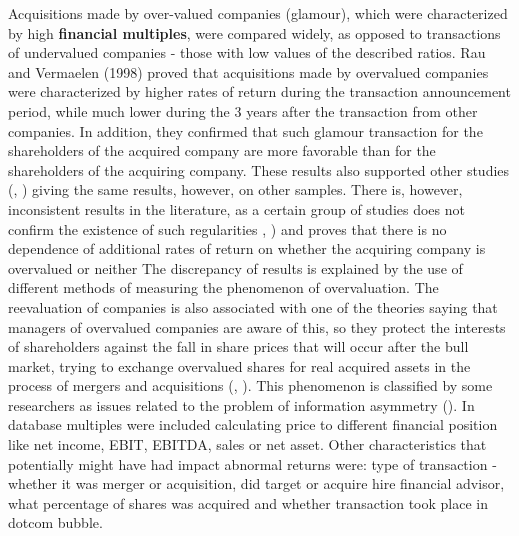 Acquisitions made by over-valued companies (glamour), which were characterized by high \textbf{financial multiples}, were compared widely, as opposed to transactions of undervalued companies - those with low values of the described ratios. Rau and Vermaelen (1998) \cite{Rau1998} proved that acquisitions made by overvalued companies were characterized by higher rates of return during the transaction announcement period, while much lower during the 3 years after the transaction from other companies. In addition, they confirmed that such glamour transaction for the shareholders of the acquired company are more favorable than for the shareholders of the acquiring company. These results also supported other studies (\cite{sundersanam2003}, \cite{andrade}) giving the same results, however, on other samples. There is, however, inconsistent results in the literature, as a certain group of studies does not confirm the existence of such regularities \cite{mitchell2000}, \cite{dong2006}) and proves that there is no dependence of additional rates of return on whether the acquiring company is overvalued or neither The discrepancy of results is explained by the use of different methods of measuring the phenomenon of overvaluation. The reevaluation of companies is also associated with one of the theories saying that managers of overvalued companies are aware of this, so they protect the interests of shareholders against the fall in share prices that will occur after the bull market, trying to exchange overvalued shares for real acquired assets in the process of mergers and acquisitions (\cite{Gregory}, \cite{SHLEIFER2003295}). This phenomenon is classified by some researchers as issues related to the problem of information asymmetry (\cite{dierkens1991}). In database multiples were included calculating price to different financial position like net income, EBIT, EBITDA, sales or net asset.
Other characteristics that potentially might have had impact abnormal returns were: type of transaction - whether it was merger or acquisition, did target or acquire hire financial advisor, what percentage of shares was acquired and whether transaction took place in dotcom bubble. 



